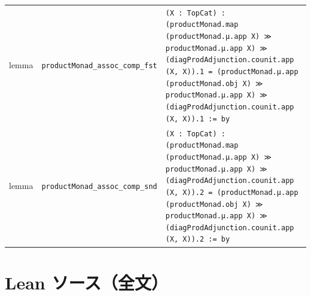 \documentclass[12pt]{article}
\theoremstyle{definition}
\begin{document}
\begin{center}
\begin{tabular}{lll}
lemma & \texttt{productMonad\_assoc\_comp\_fst} & \texttt{(X : TopCat) : (productMonad.map (productMonad.μ.app X) ≫ productMonad.μ.app X) ≫ (diagProdAdjunction.counit.app (X, X)).1 = (productMonad.μ.app (productMonad.obj X) ≫ productMonad.μ.app X) ≫ (diagProdAdjunction.counit.app (X, X)).1 := by} \\
lemma & \texttt{productMonad\_assoc\_comp\_snd} & \texttt{(X : TopCat) : (productMonad.map (productMonad.μ.app X) ≫ productMonad.μ.app X) ≫ (diagProdAdjunction.counit.app (X, X)).2 = (productMonad.μ.app (productMonad.obj X) ≫ productMonad.μ.app X) ≫ (diagProdAdjunction.counit.app (X, X)).2 := by} \\
\end{tabular}
\end{center}

\section*{Lean ソース（全文）}
\end{document}
